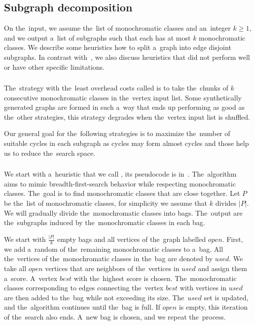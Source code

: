 \subsection{Subgraph decomposition}%
\label{sec:decomposition}

On the~input, we assume the~list of monochromatic classes
and an~integer $k\geq 1$, and we output a~list of subgraphs
such that each has at most $k$ monochromatic classes.
We describe some heuristics how to split a~graph into edge disjoint subgraphs.
In contrast with~\cite{my_paper}, we also discuss heuristics
that did not perform well or have other specific limitations.

\subsubsection*{\None{}}

The~strategy with the~least overhead costs called \None{}
is to take the~chunks of $k$ consecutive
monochromatic classes in the~vertex input list.
Some synthetically generated graphs are formed in such a~way
that \None{} ends up performing as good as the~other strategies,
this strategy degrades when the~vertex input list is shuffled.

Our general goal for the~following strategies
is to maximize the~number of suitable cycles in each
subgraph as cycles may form almost cycles and those help us
to reduce the~search space.

\subsubsection*{\Neighbors{}}

We start with a~heuristic that we call \Neighbors{},
its pseudocode is in~.
The~algorithm aims to mimic breadth-first-search
behavior while respecting monochromatic classes.
The~goal is to find monochromatic classes that are close together.
Let $P$ be the~list of monochromatic classes,
for simplicity we assume that $k$ divides $|P|$.
We will gradually divide the~monochromatic classes into bags.
The~output are the~subgraphs induced by the~monochromatic classes in each bag.

We start with $\frac{|P|}{k}$ empty bags
and all vertices of the~graph labelled $open$.
First, we add a~random of the~remaining monochromatic classes to a~bag.
All the~vertices of the~monochromatic classes in the~bag are denoted by $used$.
We take all $open$ vertices that are neighbors of the~vertices in $used$ and assign
them a~score. A~vertex $best$ with the~highest score is chosen.
The~monochromatic classes corresponding to edges connecting the~vertex $best$
with vertices in $used$ are then added to the~bag while not exceeding its size.
The~$used$ set is updated, and the~algorithm continues until the~bag is full.
If $open$ is empty, this iteration of the~search also ends.
A~new bag is chosen, and we repeat the~process.

